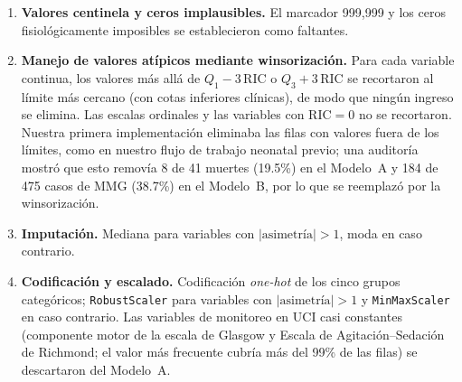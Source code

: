\documentclass[healthcare,article,submit,pdftex,moreauthors]{Definitions/mdpi_es}
\begin{document}
\begin{enumerate}[leftmargin=*,labelsep=5.8mm]
\item \textbf{Valores centinela y ceros implausibles.} El marcador 999{,}999 y los ceros
      fisiológicamente imposibles se establecieron como faltantes.
\item \textbf{Manejo de valores atípicos mediante winsorización.} Para cada variable continua,
      los valores más allá de $Q_1 - 3\,\mathrm{RIC}$ o $Q_3 + 3\,\mathrm{RIC}$ se recortaron
      al límite más cercano (con cotas inferiores clínicas), de modo que ningún ingreso se
      elimina. Las escalas ordinales y las variables con $\mathrm{RIC}=0$ no se recortaron.
      Nuestra primera implementación eliminaba las filas con valores fuera de los límites,
      como en nuestro flujo de trabajo neonatal previo; una auditoría mostró que esto removía
      8 de 41 muertes (19.5\%) en el Modelo~A y 184 de 475 casos de MMG (38.7\%) en el Modelo~B,
      por lo que se reemplazó por la winsorización.
\item \textbf{Imputación.} Mediana para variables con $|\text{asimetría}|>1$, moda en caso
      contrario.
\item \textbf{Codificación y escalado.} Codificación \emph{one-hot} de los cinco grupos
      categóricos; \texttt{RobustScaler} para variables con $|\text{asimetría}|>1$ y
      \texttt{MinMaxScaler} en caso contrario. Las variables de monitoreo en UCI casi constantes
      (componente motor de la escala de Glasgow y Escala de Agitación--Sedación de Richmond; el
      valor más frecuente cubría más del 99\% de las filas) se descartaron del Modelo~A.
\end{enumerate}
\end{document}
